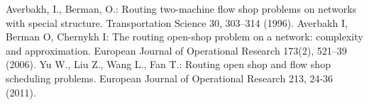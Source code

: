 \documentclass{llncs}
\begin{document}
\begin{thebibliography}{1}
\providecommand{\url}[1]{\texttt{#1}}
\providecommand{\urlprefix}{URL }

Averbakh, I., Berman, O.:  Routing two-machine flow shop problems on networks with special structure. Transportation Science 30, 303--314 (1996).
Averbakh I, Berman O, Chernykh I: The routing open-shop problem on a network: complexity and approximation. European Journal of Operational Research 173(2), 521--39 (2006).
Yu W., Liu Z., Wang L., Fan T.: Routing open shop and flow shop scheduling problems. European Journal of Operational Research 213, 24-36 (2011).


\end{thebibliography}
\end{document}
